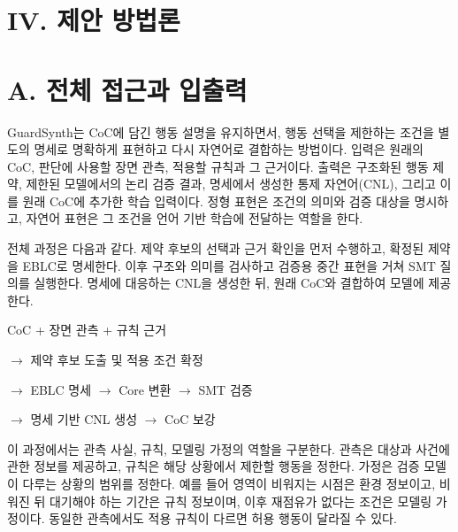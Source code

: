 \documentclass[11pt,a4paper]{article}
\begin{document}
\section*{IV. 제안 방법론}


\section*{A. 전체 접근과 입출력}

GuardSynth는 CoC에 담긴 행동 설명을 유지하면서, 행동 선택을 제한하는 조건을 별도의 명세로 명확하게 표현하고 다시 자연어로 결합하는 방법이다. 입력은 원래의 CoC, 판단에 사용할 장면 관측, 적용할 규칙과 그 근거이다. 출력은 구조화된 행동 제약, 제한된 모델에서의 논리 검증 결과, 명세에서 생성한 통제 자연어(CNL), 그리고 이를 원래 CoC에 추가한 학습 입력이다. 정형 표현은 조건의 의미와 검증 대상을 명시하고, 자연어 표현은 그 조건을 언어 기반 학습에 전달하는 역할을 한다.\par

전체 과정은 다음과 같다. 제약 후보의 선택과 근거 확인을 먼저 수행하고, 확정된 제약을 EBLC로 명세한다. 이후 구조와 의미를 검사하고 검증용 중간 표현을 거쳐 SMT 질의를 실행한다. 명세에 대응하는 CNL을 생성한 뒤, 원래 CoC와 결합하여 모델에 제공한다.\par

\begingroup\small\ttfamily\setlength{\parskip}{1pt}
\noindent\hspace*{0.0em}CoC + 장면 관측 + 규칙 근거\par
\noindent\hspace*{1.0em}\ensuremath{\rightarrow} 제약 후보 도출 및 적용 조건 확정\par
\noindent\hspace*{1.0em}\ensuremath{\rightarrow} EBLC 명세 \ensuremath{\rightarrow} Core 변환 \ensuremath{\rightarrow} SMT 검증\par
\noindent\hspace*{1.0em}\ensuremath{\rightarrow} 명세 기반 CNL 생성 \ensuremath{\rightarrow} CoC 보강\par\endgroup\par

이 과정에서는 관측 사실, 규칙, 모델링 가정의 역할을 구분한다. 관측은 대상과 사건에 관한 정보를 제공하고, 규칙은 해당 상황에서 제한할 행동을 정한다. 가정은 검증 모델이 다루는 상황의 범위를 정한다. 예를 들어 영역이 비워지는 시점은 환경 정보이고, 비워진 뒤 대기해야 하는 기간은 규칙 정보이며, 이후 재점유가 없다는 조건은 모델링 가정이다. 동일한 관측에서도 적용 규칙이 다르면 허용 행동이 달라질 수 있다.\par
\end{document}
